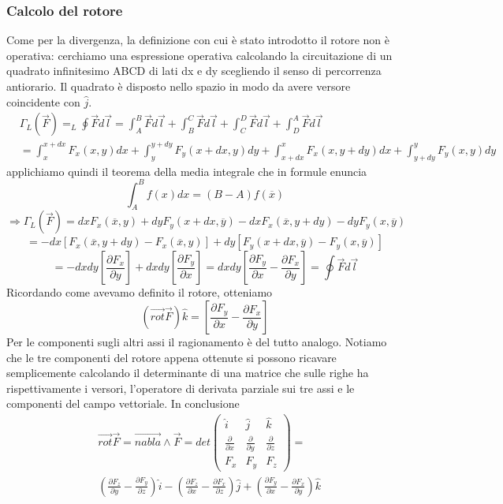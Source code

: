 \documentclass[10pt,a4paper]{article}
\begin{document}
\subsubsection{Calcolo del rotore}
Come per la divergenza, la definizione con cui è stato introdotto il rotore non è operativa: cerchiamo una espressione operativa calcolando la circuitazione di un quadrato infinitesimo ABCD di lati dx e dy scegliendo il senso di percorrenza antiorario. Il quadrato è disposto nello spazio in modo da avere versore coincidente con $\hat{j}$. 
\begin{align*}
	&\Gamma_L(\vec{F}) = _L\oint \vec{F} d\vec{l} = \int_{A}^{B} \vec{F} d\vec{l}+\int_{B}^{C} \vec{F} d\vec{l}+\int_{C}^{D} \vec{F} d\vec{l}+\int_{D}^{A} \vec{F} d\vec{l}\\
	&= \int_{x}^{x+dx} F_x(x,y) dx+\int_{y}^{y+dy} F_y(x+dx,y) dy+\int_{x+dx}^{x} F_x(x, y+dy) dx+\int_{y+dy}^{y} F_y(x, y) dy
\end{align*}  
applichiamo quindi il teorema della media integrale che in formule enuncia
\[\int_{A}^{B}f(x)dx=(B-A)f(\overline{x})\]
\[\Rightarrow\Gamma_L(\vec{F}) = dxF_x(\overline{x}, y)+dyF_y(x+dx, \overline{y})-dxF_x(\overline{x}, y+dy)-dyF_y(x, \overline{y})\]
\[=-dx[F_x(\overline{x}, y+dy)-F_x(\overline{x}, y)]+dy[F_y(x+dx, \overline{y})-F_y(x, \overline{y})]\]
\[=-dxdy\left[\frac{\partial F_x}{\partial y}\right]+dxdy\left[\frac{\partial F_y}{\partial x}\right] = dxdy\left[\frac{\partial F_y}{\partial x}-\frac{\partial F_x}{\partial y}\right]=\oint\vec{F}d\vec{l}\]
Ricordando come avevamo definito il rotore, otteniamo 
\[(\vec{rot}\vec{F})\hat{k} = \left[\frac{\partial F_y}{\partial x}-\frac{\partial F_x}{\partial y}\right]\]
Per le componenti sugli altri assi il ragionamento è del tutto analogo. Notiamo che le tre componenti del rotore appena ottenute si possono ricavare semplicemente calcolando il determinante di una matrice che sulle righe ha rispettivamente i versori, l'operatore di derivata parziale sui tre assi e le componenti del campo vettoriale. In conclusione
\begin{align*}
&\vec{rot}\vec{F}=\vec{nabla}\wedge\vec{F}=det
\begin{pmatrix}
	\hat{i}&\hat{j}&\hat{k}\\
	\frac{\partial}{\partial x}&\frac{\partial}{\partial y}&\frac{\partial}{\partial z}\\
	F_x&F_y&F_z
\end{pmatrix}=\\
&(\frac{\partial F_z}{\partial y}-\frac{\partial F_y}{\partial z})\hat{i}
-(\frac{\partial F_z}{\partial x}-\frac{\partial F_x}{\partial z})\hat{j}
+(\frac{\partial F_y}{\partial x}-\frac{\partial F_x}{\partial y})\hat{k}
\end{align*}
\end{document}
